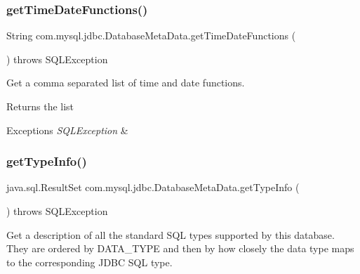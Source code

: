 \subsubsection{\texorpdfstring{get\+Time\+Date\+Functions()}{getTimeDateFunctions()}}
{\footnotesize\ttfamily String com.\+mysql.\+jdbc.\+Database\+Meta\+Data.\+get\+Time\+Date\+Functions (\begin{DoxyParamCaption}{ }\end{DoxyParamCaption}) throws S\+Q\+L\+Exception}

Get a comma separated list of time and date functions.

\begin{DoxyReturn}{Returns}
the list 
\end{DoxyReturn}

\begin{DoxyExceptions}{Exceptions}
{\em S\+Q\+L\+Exception} & \\
\hline
\end{DoxyExceptions}
\mbox{\label{classcom_1_1mysql_1_1jdbc_1_1_database_meta_data_a0a7b3d02517a744b77c3085eaccd871d}} 
\subsubsection{\texorpdfstring{get\+Type\+Info()}{getTypeInfo()}}
{\footnotesize\ttfamily java.\+sql.\+Result\+Set com.\+mysql.\+jdbc.\+Database\+Meta\+Data.\+get\+Type\+Info (\begin{DoxyParamCaption}{ }\end{DoxyParamCaption}) throws S\+Q\+L\+Exception}

Get a description of all the standard S\+QL types supported by this database. They are ordered by D\+A\+T\+A\+\_\+\+T\+Y\+PE and then by how closely the data type maps to the corresponding J\+D\+BC S\+QL type. 

